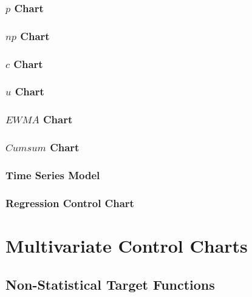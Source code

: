 \subsubsection{$p$ Chart}
\subsubsection{$np$ Chart}
\subsubsection{$c$ Chart}
\subsubsection{$u$ Chart}
\subsubsection{$EWMA$ Chart}
\subsubsection{$Cumsum$ Chart}
\subsubsection{Time Series Model}
\subsubsection{Regression Control Chart}




\section{Multivariate Control Charts}



\subsection{Non-Statistical Target Functions}





